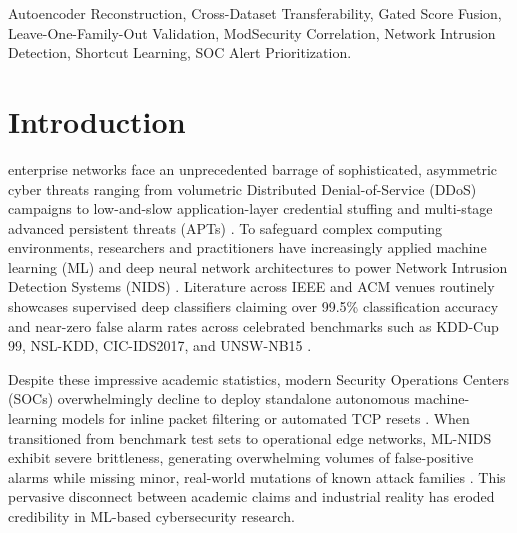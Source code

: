 \documentclass[conference]{IEEEtran}
\begin{document}
\begin{IEEEkeywords}
Autoencoder Reconstruction, Cross-Dataset Transferability, Gated Score Fusion, Leave-One-Family-Out Validation, ModSecurity Correlation, Network Intrusion Detection, Shortcut Learning, SOC Alert Prioritization.
\end{IEEEkeywords}

\section{Introduction}
 enterprise networks face an unprecedented barrage of sophisticated, asymmetric cyber threats ranging from volumetric Distributed Denial-of-Service (DDoS) campaigns to low-and-slow application-layer credential stuffing and multi-stage advanced persistent threats (APTs) \cite{ring2019survey, chaabouni2019network}. To safeguard complex computing environments, researchers and practitioners have increasingly applied machine learning (ML) and deep neural network architectures to power Network Intrusion Detection Systems (NIDS) \cite{apruzzese2023modeling, buczak2016survey}. Literature across IEEE and ACM venues routinely showcases supervised deep classifiers claiming over 99.5\% classification accuracy and near-zero false alarm rates across celebrated benchmarks such as KDD-Cup 99, NSL-KDD, CIC-IDS2017, and UNSW-NB15 \cite{sharafaldin2018toward, moustafa2015unsw, tavallaee2009detailed}.

Despite these impressive academic statistics, modern Security Operations Centers (SOCs) overwhelmingly decline to deploy standalone autonomous machine-learning models for inline packet filtering or automated TCP resets \cite{sommer2010outside}. When transitioned from benchmark test sets to operational edge networks, ML-NIDS exhibit severe brittleness, generating overwhelming volumes of false-positive alarms while missing minor, real-world mutations of known attack families \cite{apruzzese2023role, ardagna2023machine}. This pervasive disconnect between academic claims and industrial reality has eroded credibility in ML-based cybersecurity research.
\end{document}

